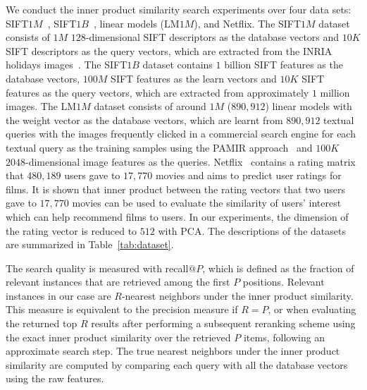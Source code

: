 \documentclass[10pt, letterpaper]{article}
\begin{document}
We conduct the inner product similarity search experiments
over four data sets:
SIFT$1M$~\cite{JegouDS11},
SIFT$1B$~\cite{JegouTDA11},
linear models (LM$1M$),
and Netflix.
The SIFT$1M$ dataset
consists of $1M$ $128$-dimensional SIFT descriptors
as the database vectors
and $10K$ SIFT descriptors
as the query vectors,
which
are extracted from the INRIA
holidays images~\cite{JegouDS08}.
The SIFT$1B$ dataset contains $1$ billion
SIFT features as the database vectors,
$100M$ SIFT features as the learn vectors
and $10K$ SIFT features
as the query vectors,
which
are extracted from approximately $1$ million images.
The LM$1M$ dataset consists of
around $1M$ ($890, 912$) linear models
with the weight vector as the database vectors,
which are
learnt from $890, 912$ textual queries
with the images frequently clicked in a commercial search engine
for each textual query
as the training samples
using the PAMIR approach~\cite{GrangierB08}
and $100K$ $2048$-dimensional image features
as the queries.
Netflix~\cite{BennettL07} contains
a rating matrix that $480,189$ users gave to $17,770$ movies
and aims to predict user ratings for films.
It is shown that
inner product between the rating vectors that two users
gave to $17,770$ movies
can be used to evaluate
the similarity of users' interest
which can help recommend films to users.
In our experiments,
the dimension of the rating vector is reduced to $512$
with PCA.
The descriptions of the datasets
are summarized in Table~\ref{tab:dataset}.

The search quality is measured with recall$@P$,
which is defined as
the fraction of relevant instances that are retrieved
among the first $P$ positions.
Relevant instances in our case
are $R$-nearest neighbors
under the inner product similarity.
This measure is equivalent to
the precision measure
if $R=P$,
or when evaluating the returned top $R$ results
after performing a subsequent reranking scheme using the exact inner product similarity
over the retrieved $P$ items,
following an approximate search step.
The true nearest neighbors under the inner product similarity
are computed by comparing each query with all the database vectors
using the raw features.
\end{document}
